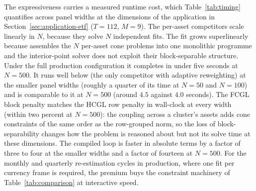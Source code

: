 \documentclass[article]{jss}
\begin{document}
The expressiveness carries a measured runtime cost, which
Table~\ref{tab:timing} quantifies across panel widths at the
dimensions of the application in
Section~\ref{sec:application-etf} ($T = 112$, $M = 9$). The
per-asset competitors scale linearly in $N$, because they solve $N$
independent fits. The  fit grows
superlinearly because  assembles the $N$ per-asset cone
problems into one monolithic programme and the interior-point solver
does not exploit their block-separable structure. Under the full production configuration it completes
in under five seconds at $N = 500$. It runs well below  (the
only competitor with adaptive reweighting) at the smaller panel widths
(roughly a quarter of its time at $N = 50$ and $N = 100$) and is
comparable to it at $N = 500$ (around $4.5$ against $4.0$ seconds).
The FCGL block penalty matches the HCGL row penalty in wall-clock at
every width (within two percent at $N = 500$): the coupling across a
cluster's assets adds cone constraints of the same order as the
row-grouped norm, so the loss of block-separability changes how the
problem is reasoned about but not its solve time at these dimensions.
The compiled  loop is faster in absolute terms by a
factor of three to four at the smaller widths and a factor of
fourteen at $N = 500$.
For the monthly and quarterly re-estimation cycles in 
production, where one fit per currency frame is required, the
premium buys the constraint machinery of
Table~\ref{tab:comparison} at interactive speed.
\end{document}
